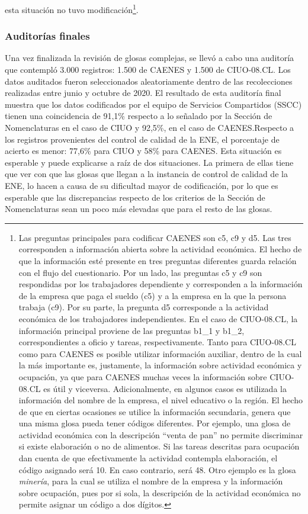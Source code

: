 \documentclass[
  12pt,
  spanish,
]{article}
\begin{document}
esta situación no tuvo modificación\footnote{Las preguntas principales
  para codificar CAENES son c5, c9 y d5. Las tres corresponden a
  información abierta sobre la actividad económica. El hecho de que la
  información esté presente en tres preguntas diferentes guarda relación
  con el flujo del cuestionario. Por un lado, las preguntas c5 y c9 son
  respondidas por los trabajadores dependiente y corresponden a la
  información de la empresa que paga el sueldo (c5) y a la empresa en la
  que la persona trabaja (c9). Por su parte, la pregunta d5 corresponde
  a la actividad económica de los trabajadores independientes. En el
  caso de CIUO-08.CL, la información principal proviene de las preguntas
  b1\_1 y b1\_2, correspondientes a oficio y tareas, respectivamente.
  Tanto para CIUO-08.CL como para CAENES es posible utilizar información
  auxiliar, dentro de la cual la más importante es, justamente, la
  información sobre actividad económica y ocupación, ya que para CAENES
  muchas veces la información sobre CIUO-08.CL es útil y viceversa.
  Adicionalmente, en algunos casos es utilizada la información del
  nombre de la empresa, el nivel educativo o la región. El hecho de que
  en ciertas ocasiones se utilice la información secundaria, genera que
  una misma glosa pueda tener códigos diferentes. Por ejemplo, una glosa
  de actividad económica con la descripción ``venta de pan'' no permite
  discriminar si existe elaboración o no de alimentos. Si las tareas
  descritas para ocupación dan cuenta de que efectivamente la actividad
  contempla elaboración, el código asignado será 10. En caso contrario,
  será 48. Otro ejemplo es la glosa \emph{minería}, para la cual se
  utiliza el nombre de la empresa y la información sobre ocupación, pues
  por si sola, la descripción de la actividad económica no permite
  asignar un código a dos dígitos.}.

\hypertarget{auditoruxedas-finales}{%
\subsubsection{Auditorías finales}\label{auditoruxedas-finales}}

Una vez finalizada la revisión de glosas complejas, se llevó a cabo una
auditoría que contempló 3.000 registros: 1.500 de CAENES y 1.500 de
CIUO-08.CL. Los datos auditados fueron seleccionados aleatoriamente
dentro de las recolecciones realizadas entre junio y octubre de 2020. El
resultado de esta auditoría final muestra que los datos codificados por
el equipo de Servicios Compartidos (SSCC) tienen una coincidencia de
91,1\% respecto a lo señalado por la Sección de Nomenclaturas en el caso
de CIUO y 92,5\%, en el caso de CAENES.Respecto a los registros
provenientes del control de calidad de la ENE, el porcentaje de acierto
es menor: 77,6\% para CIUO y 58\% para CAENES. Esta situación es
esperable y puede explicarse a raíz de dos situaciones. La primera de
ellas tiene que ver con que las glosas que llegan a la instancia de
control de calidad de la ENE, lo hacen a causa de su dificultad mayor de
codificación, por lo que es esperable que las discrepancias respecto de
los criterios de la Sección de Nomenclaturas sean un poco más elevadas
que para el resto de las glosas.
\end{document}
